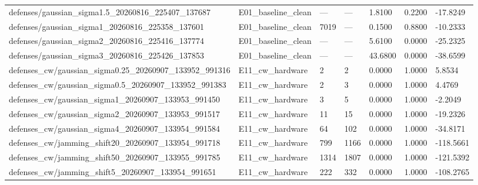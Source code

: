 \begin{tabular}{lllllll}
defenses/gaussian_sigma1.5_20260816_225407_137687 & E01_baseline_clean & — & — & 1.8100 & 0.2200 & -17.8249 \\
defenses/gaussian_sigma1_20260816_225358_137601 & E01_baseline_clean & 7019 & — & 0.1500 & 0.8800 & -10.2333 \\
defenses/gaussian_sigma2_20260816_225416_137774 & E01_baseline_clean & — & — & 5.6100 & 0.0000 & -25.2325 \\
defenses/gaussian_sigma3_20260816_225426_137853 & E01_baseline_clean & — & — & 43.6800 & 0.0000 & -38.6599 \\
defenses_cw/gaussian_sigma0.25_20260907_133952_991316 & E11_cw_hardware & 2 & 2 & 0.0000 & 1.0000 & 5.8534 \\
defenses_cw/gaussian_sigma0.5_20260907_133952_991383 & E11_cw_hardware & 2 & 3 & 0.0000 & 1.0000 & 4.4769 \\
defenses_cw/gaussian_sigma1_20260907_133953_991450 & E11_cw_hardware & 3 & 5 & 0.0000 & 1.0000 & -2.2049 \\
defenses_cw/gaussian_sigma2_20260907_133953_991517 & E11_cw_hardware & 11 & 15 & 0.0000 & 1.0000 & -19.2326 \\
defenses_cw/gaussian_sigma4_20260907_133954_991584 & E11_cw_hardware & 64 & 102 & 0.0000 & 1.0000 & -34.8171 \\
defenses_cw/jamming_shift20_20260907_133954_991718 & E11_cw_hardware & 799 & 1166 & 0.0000 & 1.0000 & -118.5661 \\
defenses_cw/jamming_shift50_20260907_133955_991785 & E11_cw_hardware & 1314 & 1807 & 0.0000 & 1.0000 & -121.5392 \\
defenses_cw/jamming_shift5_20260907_133954_991651 & E11_cw_hardware & 222 & 332 & 0.0000 & 1.0000 & -108.2765 \\
\bottomrule
\end{tabular}
